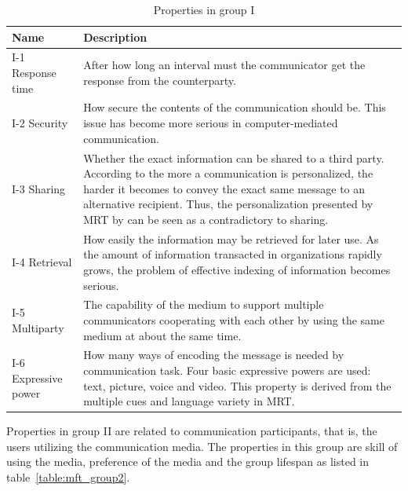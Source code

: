 \documentclass[english,12pt,a4paper,pdftex]{article}
\begin{document}
\begin{table}[!h]
\renewcommand{\arraystretch}{1.3}
\caption{Properties in group I}
\label{table:mft_group1}
\centering
\begin{tabular}{|p{4cm}|p{10cm}|}
\hline
\textbf{Name} & \textbf{Description}\\
\hline
I-1 Response time & After how long an interval must the communicator get the response from the counterparty. \\
\hline
I-2 Security & How secure the contents of the communication should be. This issue has become more serious in computer-mediated communication. \\
\hline
I-3 Sharing & Whether the exact information can be shared to a third party. According to \citet{higa2007} the more a communication is personalized, the harder it becomes to convey the exact same message to an alternative recipient. Thus, the personalization presented by \ac{MRT} by \citet{daft1986} can be seen as a contradictory to sharing. \\
\hline
I-4 Retrieval & How easily the information may be retrieved for later use. As the amount of information transacted in organizations rapidly grows, the problem of effective indexing of information becomes serious. \\
\hline
I-5 Multiparty & The capability of the medium to support multiple communicators cooperating with each other by using the same medium at about the same time. \\
\hline
I-6 Expressive power & How many ways of encoding the message is needed by communication task. Four basic expressive powers are used: text, picture, voice and video. This property is derived from the multiple cues and language variety in \ac{MRT}. \\
\hline
\end{tabular}
\end{table}

Properties in group II are related to communication participants, that is, the users utilizing the communication media. The properties in this group are skill of using the media, preference of the media and the group lifespan as listed in table~\ref{table:mft_group2}.
\end{document}
